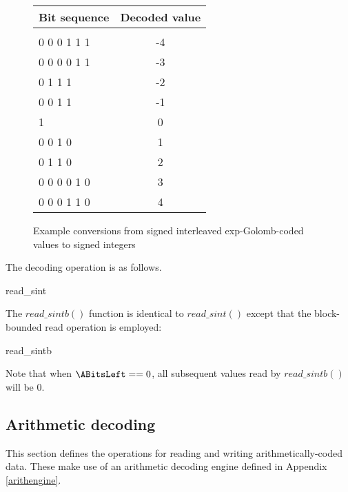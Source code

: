 \begin{figure}[!ht]
\centering
\begin{tabular}{l|c}
Bit sequence & Decoded value \\
\hline\\
0 0 0 1 1 1         &  -4\\
0 0 0 0 1 1         &  -3\\
0 1 1 1            &  -2\\
0 0 1 1           &  -1\\
1                 &  0\\
0 0 1 0           &  1\\
0 1 1 0            &  2\\
0 0 0 0 1 0         &  3\\
0 0 0 1 1 0         &  4\\
\end{tabular}

\caption{Example conversions from signed interleaved exp-Golomb-coded values 
to signed integers \label{segolcodings}}
\end{figure}

The decoding operation is as follows.

\begin{pseudo}{read\_sint}{}
  \bsEND
\bsEND
{}
\end{pseudo}

The $read\_sintb()$ function is identical to $read\_sint()$ except that the block-bounded read
operation is employed:

\begin{pseudo}{read\_sintb}{}
  \bsEND
\bsEND
{}
\end{pseudo}

Note that when $\ABitsLeft==0$, all subsequent values read by $read\_sintb()$ will be 0.

\subsection{Arithmetic decoding}

\label{arithdecoding}

This section defines the operations for reading and writing arithmetically-coded
data. These make use of an arithmetic decoding engine defined in Appendix 
\ref{arithengine}. 

